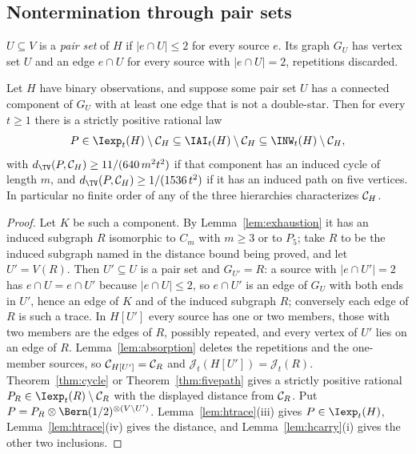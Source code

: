 \subsection{Nontermination through pair sets}

\begin{definition}\label{def:pairset}
$U\subseteq V$ is a \emph{pair set} of $H$ if $|e\cap U|\le2$ for every source $e$. Its graph $G_U$ has vertex set $U$ and an edge $e\cap U$ for every source with $|e\cap U|=2$, repetitions discarded.
\end{definition}

\begin{theorem}\label{thm:hpairset}
Let $H$ have binary observations, and suppose some pair set $U$ has a connected component of $G_U$ with at least one edge that is not a double-star. Then for every $t\ge1$ there is a strictly positive rational law
\[
P\in\Iexp_t(H)\setminus\Cscen{H}\subseteq\IAI_t(H)\setminus\Cscen{H}\subseteq\INW_t(H)\setminus\Cscen{H},
\]
with $d_{\TV}(P,\Cscen{H})\ge11/(640\,m^2t^2)$ if that component has an induced cycle of length $m$, and $d_{\TV}(P,\Cscen{H})\ge1/(1536\,t^2)$ if it has an induced path on five vertices. In particular no finite order of any of the three hierarchies characterizes $\mathcal C_{H}$.
\end{theorem}

\begin{proof}
Let $K$ be such a component. By Lemma~\ref{lem:exhaustion} it has an induced subgraph $R$ isomorphic to $C_m$ with $m\ge3$ or to $P_5$; take $R$ to be the induced subgraph named in the distance bound being proved, and let $U'=V(R)$. Then $U'\subseteq U$ is a pair set and $G_{U'}=R$: a source with $|e\cap U'|=2$ has $e\cap U=e\cap U'$ because $|e\cap U|\le2$, so $e\cap U'$ is an edge of $G_U$ with both ends in $U'$, hence an edge of $K$ and of the induced subgraph $R$; conversely each edge of $R$ is such a trace. In $H[U']$ every source has one or two members, those with two members are the edges of $R$, possibly repeated, and every vertex of $U'$ lies on an edge of $R$. Lemma~\ref{lem:absorption} deletes the repetitions and the one-member sources, so $\mathcal C_{H[U']}=\mathcal C_{R}$ and $\mathcal J_t(H[U'])=\mathcal J_t(R)$. Theorem~\ref{thm:cycle} or Theorem~\ref{thm:fivepath} gives a strictly positive rational $P_R\in\Iexp_t(R)\setminus\Cscen{R}$ with the displayed distance from $\mathcal C_{R}$. Put $P=P_R\otimes\Bern(1/2)^{\otimes(V\setminus U')}$. Lemma~\ref{lem:htrace}(iii) gives $P\in\Iexp_t(H)$, Lemma~\ref{lem:htrace}(iv) gives the distance, and Lemma~\ref{lem:hcarry}(i) gives the other two inclusions.
\end{proof}

